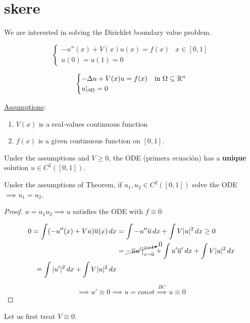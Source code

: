 \chapter{skere}

We are interested in solving the Dirichlet boundary value problem.

\[\begin{cases}
    -u''(x)+V(x)u(x)=f(x) &x\in [0,1]\\
    u(0)=u(1)=0
\end{cases}\]

\[\begin{cases}
    -\Delta u+V(x)u=f(x) &\text{in }\Omega\subseteq \mathbb{R}^n\\
    u|_{\partial\Omega}=0
\end{cases}\]

\underline{Assumptions}:\begin{enumerate}
    \item $V(x)$ is a real-values continuous function
    \item $f(x)$ is a given continuous function on $[0,1]$.
\end{enumerate}

\begin{ftheorem}
    Under the assumptions and $V\geq 0$, the ODE (primera ecuación) has a \textbf{unique} solution $u\in C^2([0,1])$.
\end{ftheorem}

\begin{fproposition}
    Under the assumptions of Theorem, if $u_1,u_2\in C^2([0,1])$ solve the ODE $\implies u_1=u_2$.
\end{fproposition}

\begin{proof}
    $u=u_1u_2\implies u$ satisfies the ODE with $f\equiv 0$
    
    \begin{align*}
        0=\int (-u''(x)+Vu)\overline{u}(x)\,dx&=\int -u''\overline{u}\,dx+\int V|u|^2\,dx\geq 0\\
        &=\cancelto{0}{-\overline{u}u'\big\rvert_{x=0}^{x=1}}+\int u'\overline{u}'\,dx+\int V|u|^2\,dx\\
        =\int |u'|^2\,dx+\int V|u|^2\,dx
    \end{align*}

    \[\implies u'\equiv 0\implies u=const\overset{BC}{\implies} u\equiv 0\]
\end{proof}

Let us first treat $V\equiv 0$.

